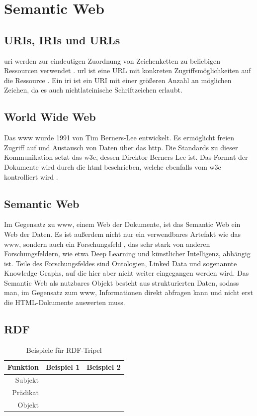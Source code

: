 \section{Semantic Web}

\subsection{URIs, IRIs und URLs}
\ac{uri} werden zur eindeutigen Zuordnung von Zeichenketten zu beliebigen Ressourcen verwendet \citep{uri}.
\ac{url} ist eine URL mit konkreten Zugriffsmöglichkeiten auf die Ressource \citep{url}.
Ein \ac{iri} ist ein URI mit einer größeren Anzahl an möglichen Zeichen, da es auch nichtlateinische Schriftzeichen erlaubt.

\subsection{World Wide Web}
Das \ac{www} wurde 1991 von Tim Berners-Lee entwickelt.
Es ermöglicht freien Zugriff auf und Austausch von Daten über das \ac{http}.
Die Standards zu dieser Kommunikation setzt das \ac{w3c}, dessen Direktor Berners-Lee ist.
Das Format der Dokumente wird durch die \ac{html} beschrieben, welche ebenfalls vom \ac{w3c} kontrolliert wird \citep{www}.

\subsection{Semantic Web}
Im Gegensatz zu \ac{www}, einem Web der Dokumente, ist das Semantic Web ein Web der Daten.
Es ist außerdem nicht nur ein verwendbares Artefakt wie das \ac{www}, sondern auch ein Forschungsfeld \citep{semanticwebreview}, das sehr stark von anderen Forschungsfeldern, wie etwa Deep Learning und künstlicher Intelligenz, abhängig ist. Teile des Forschungsfeldes sind Ontologien, Linked Data und sogenannte Knowledge Graphs, auf die hier aber nicht weiter eingegangen werden wird.
Das Semantic Web als nutzbares Objekt besteht aus strukturierten Daten, sodass man, im Gegensatz zum \ac{www}, Informationen direkt abfragen kann und nicht erst die HTML-Dokumente auswerten muss.
\subsection{RDF}
\begin{table}[h]\centering\scriptsize
  \begin{tabulary}{\textwidth}{rrl}
    \toprule
    Funktion & Beispiel 1 & Beispiel 2 \\
    \midrule
    Subjekt &  &  \\
    Prädikat &  &  \\
    Objekt &  &  \\
    \bottomrule
  \end{tabulary}
  \caption{Beispiele für RDF-Tripel}
  \label{tab:rdftripleexample}
\end{table}


